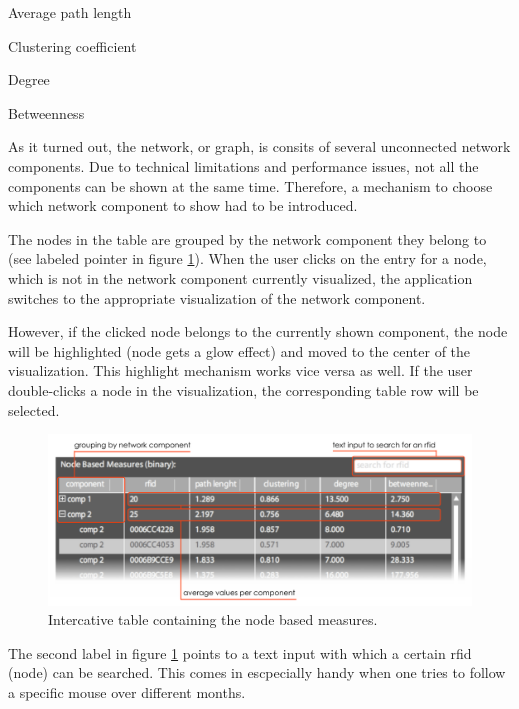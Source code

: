 \begin{mylist}
\item Average path length
\item Clustering coefficient
\item Degree
\item Betweenness
\end{mylist}

As it turned out, the network, or graph, is consits of several unconnected network components. Due to technical limitations and performance issues, not all the components can be shown at the same time. Therefore, a mechanism to choose which network component to show had to be introduced.

The nodes in the table are grouped by the network component they belong to (see labeled pointer in figure \ref{fig:node_based_measures}). When the user clicks on the entry for a node, which is not in the network component currently visualized, the application switches to the appropriate visualization of the network component.

However, if the clicked node belongs to the currently shown component, the node will be highlighted (node gets a glow effect) and moved to the center of the visualization. This highlight mechanism works vice versa as well. If the user double-clicks a node in the visualization, the corresponding table row will be selected.

\begin{figure}[!htpb]
\begin{center}
  \includegraphics[width=\textwidth]{assets/pdf/node_based_measures.pdf}
  \caption[Node based measures]{Intercative table containing the node based measures.}
  \label{fig:node_based_measures}
\end{center}
\end{figure}

The second label in figure \ref{fig:node_based_measures} points to a text input with which a certain rfid (node) can be searched. This comes in escpecially handy when one tries to follow a specific mouse over different months.    

